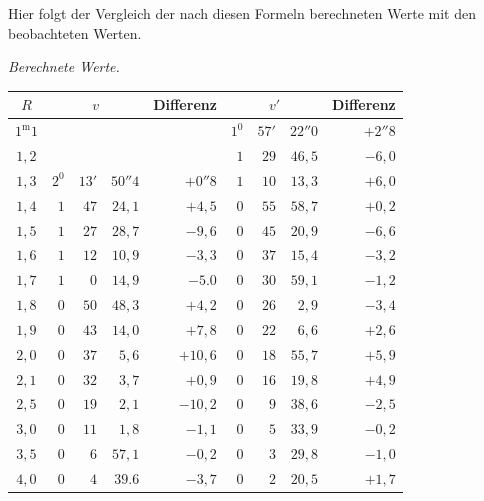 Hier folgt der Vergleich der nach diesen Formeln berechneten Werte mit den beobachteten Werten.
\begin{center}
\textit{Berechnete Werte.}\par
\nopagebreak[4]
\setlength{\tabcolsep}{4pt}
\begin{tabular}{c||rrr|r||rrr|r}
$R$&\multicolumn{3}{c|}{$v$}&Differenz&\multicolumn{3}{c|}{$v'$}&Differenz\\\hline
$1^{\mathrm m}1$&&&&&$1^0$&$57'$&$22''0$&$+2''8$\\
$1{,}2$&&&&&$1$&$29$&$46{,}5$&$-6{,}0$\\
$1{,}3$&$2^0$&$13'$&$50''4$&$+0''8$&$1$&$10$&$13{,}3$&$+6{,}0$\\
$1{,}4$&$1$&$47$&$24{,}1$&$+4{,}5$&$0$&$55$&$58{,}7$&$+0{,}2$\\
$1{,}5$&$1$&$27$&$28{,}7$&$-9{,}6$&$0$&$45$&$20{,}9$&$-6{,}6$\\
$1{,}6$&$1$&$12$&$10{,}9$&$-3{,}3$&$0$&$37$&$15{,}4$&$-3{,}2$\\
$1{,}7$&$1$&$0$&$14{,}9$&$-5.0$&$0$&$30$&$59{,}1$&$-1{,}2$\\
$1{,}8$&$0$&$50$&$48{,}3$&$+4{,}2$&$0$&$26$&$2{,}9$&$-3{,}4$\\
$1{,}9$&$0$&$43$&$14{,}0$&$+7{,}8$&$0$&$22$&$6{,}6$&$+2{,}6$\\
$2{,}0$&$0$&$37$&$5{,}6$&$+10{,}6$&$0$&$18$&$55{,}7$&$+5{,}9$\\
$2{,}1$&$0$&$32$&$3{,}7$&$+0{,}9$&$0$&$16$&$19{,}8$&$+4{,}9$\\
$2{,}5$&$0$&$19$&$2{,}1$&$-10{,}2$&$0$&$9$&$38{,}6$&$-2{,}5$\\
$3{,}0$&$0$&$11$&$1{,}8$&$-1{,}1$&$0$&$5$&$33{,}9$&$-0{,}2$\\
$3{,}5$&$0$&$6$&$57{,}1$&$-0{,}2$&$0$&$3$&$29{,}8$&$-1{,}0$\\
$4{,}0$&$0$&$4$&$39.6$&$-3{,}7$&$0$&$2$&$20{,}5$&$+1{,}7$
\end{tabular}
\end{center}

